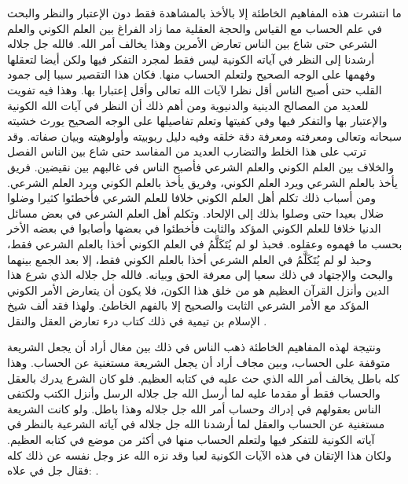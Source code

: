 ما انتشرت هذه المفاهيم الخاطئة إلا بالأخذ بالمشاهدة فقط دون الإعتبار والنظر والبحث في علم الحساب مع القياس والحجة العقلية مما زاد الفراغ بين العلم الكوني والعلم الشرعي حتى شاع بين الناس تعارض الأمرين وهذا يخالف أمر الله. فالله جل جلاله أرشدنا إلى النظر في آياته الكونية ليس فقط لمجرد التفكر فيها ولكن أيضا لتعقلها وفهمها على الوجه الصحيح ولتعلم الحساب منها. فكان هذا التقصير سببا إلى جمود القلب حتى أصبح الناس أقل نظرا لآيات الله تعالى وأقل إعتبارا بها. وهذا فيه تفويت للعديد من المصالح الدينية والدنيوية ومن أهم ذلك أن النظر في آيات الله الكونية والإعتبار بها والتفكر فيها وفي كفيتها وتعلم تفاصيلها على الوجه الصحيح يورث خشيته سبحانه وتعالى ومعرفته ومعرفة دقة خلقه وفيه دليل ربوبيته وأولوهيته وبيان صفاته. وقد ترتب على هذا الخلط والتضارب العديد من المفاسد حتى شاع بين الناس الفصل والخلاف بين العلم الكوني والعلم الشرعي فأصبح الناس في غالبهم بين نقيضين. فريق يأخذ بالعلم الشرعي ويرد العلم الكوني، وفريق يأخذ بالعلم الكوني ويرد العلم الشرعي. ومن أسباب ذلك تكلم أهل العلم الكوني خلافا للعلم الشرعي فأخطئوا كثيرا وضلوا ضلال بعيدا حتى وصلوا بذلك إلى الإلحاد. وتكلم أهل العلم الشرعي في بعض مسائل الدنيا خلافا للعلم الكوني المؤكد والثابت فأخطئوا في بعضها وأصابوا في بعضه الأخر بحسب ما فهموه وعقلوه. فحبذ لو لم يُتَكَلَّمُ في العلم الكوني أخذا بالعلم الشرعي فقط، وحبذ لو لم يُتَكَلَّمُ في العلم الشرعي أخذا بالعلم الكوني فقط، إلا بعد الجمع بينهما والبحث والإجتهاد في ذلك سعيا إلى معرفة الحق وبيانه. فالله جل جلاله الذي شرع هذا الدين وأنزل القرآن العظيم هو من خلق هذا الكون، فلا يكون أن يتعارض الأمر الكوني المؤكد مع الأمر الشرعي الثابت والصحيح إلا بالفهم الخاطئ. ولهذا فقد ألف شيخ الإسلام بن تيمية في ذلك كتاب درء تعارض العقل والنقل \cite{ibnTaimia_DTAWN}.


ونتيجة لهذه المفاهيم الخاطئة ذهب الناس في ذلك بين مغال أراد أن يجعل الشريعة متوقفة على الحساب، وبين مجاف أراد أن يجعل الشريعة مستغنية عن الحساب. وهذا كله باطل يخالف أمر الله الذي حث عليه في كتابه العظيم. فلو كان الشرع يدرك بالعقل والحساب فقط أو مقدما عليه لما أرسل الله جل جلاله الرسل وأنزل الكتب ولكتفى الناس بعقولهم في إدراك وحساب أمر الله جل جلاله وهذا باطل. ولو كانت الشريعة مستغنية عن الحساب والعقل لما أرشدنا الله جل جلاله في آياته الشرعية بالنظر في آياته الكونية للتفكر فيها ولتعلم الحساب منها في أكثر من موضع في كتابه العظيم. ولكان هذا الإتقان في هذه الآيات الكونية لعبا وقد نزه الله عز وجل نفسه عن ذلك كله فقال جل في علاه: \quranayah*[44][38-39] {\footnotesize (\surahname*[44])}.


